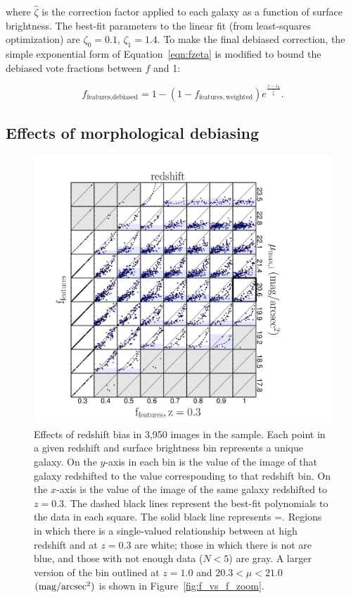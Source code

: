 \documentclass[twocolumn]{aastex6}
\begin{document}
\noindent where $\hat\zeta$ is the correction factor applied to each galaxy as
a function of surface brightness. The best-fit parameters to the linear fit
(from least-squares optimization) are $\zeta_0=0.1$, $\zeta_1=1.4$. To make the
final debiased correction, the simple exponential form of
Equation~\ref{eqn:fzeta} is modified to bound the debiased vote fractions
between $f$ and 1:

\begin{equation}
f_\textrm{features,debiased} = 1 - (1 - f_\mathrm{features,weighted})e^{\frac{z-z_0}{\hat\zeta}}.
\label{eqn:fzeta_mod}
\end{equation}

\subsection{Effects of morphological debiasing}\label{ssec:zeta_results}

\begin{figure}
\centering
\includegraphics[width=\textwidth]{figures/p_vs_p_SB_redshift.pdf}
\caption{Effects of redshift bias in 3,950 images in the \ferengi{} sample.
Each point in a given redshift and surface brightness bin represents a
unique galaxy. On the $y$-axis in each bin is the \ffeatures{} value of the
image of that galaxy redshifted to the value corresponding to that redshift
bin. On the $x$-axis is the \ffeatures{} value of the image of the same galaxy
redshifted to $z=0.3$. The dashed black lines represent the best-fit
polynomials to the data in each square. The solid black line represents
\ffeaturesz=\ffeaturesrest. Regions in which there is a single-valued
relationship between \ffeatures{} at high redshift and at $z=0.3$ are white;
those in which there is not are blue, and those with not enough data ($N<5$)
are gray. A larger version of the bin outlined at $z=1.0$ and $20.3 < \mu < 21.0$ $\rm (mag/arcsec^2)$ is shown in Figure~\ref{fig:f_vs_f_zoom}.}
\label{fig:f_vs_f}
\end{figure} 
\end{document}
